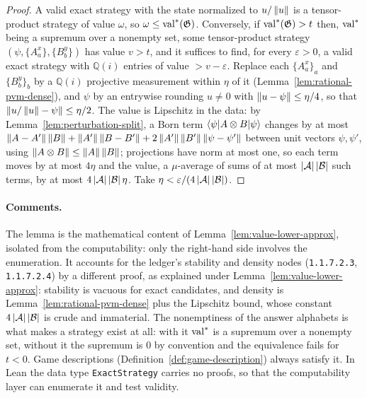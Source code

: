 \begin{proof}
\leanok
A valid exact strategy with the state normalized to $u/\left\| {u} \right\|$ is a tensor-product
strategy of value $\omega$, so $\omega \leq \mathrm{val}^*(\mathfrak{G})$. Conversely, if
$\mathrm{val}^*(\mathfrak{G}) > t$ then, $\mathrm{val}^*$ being a supremum over a nonempty set, some
tensor-product strategy $(\psi, \{A^x_a\}, \{B^y_b\})$ has value $v > t$, and it suffices
to find, for every $\varepsilon > 0$, a valid exact strategy with $\mathbb{Q}(i)$ entries of
value $> v - \varepsilon$. Replace each $\{A^x_a\}_a$ and $\{B^y_b\}_b$ by a $\mathbb{Q}(i)$
projective measurement within $\eta$ of it (Lemma~\ref{lem:rational-pvm-dense}), and
$\psi$ by an entrywise rounding $u \neq 0$ with $\left\| {u - \psi} \right\| \leq \eta/4$, so that
$\left\| {u/\left\| {u} \right\| - \psi} \right\| \leq \eta/2$. The value is Lipschitz in the data: by
Lemma~\ref{lem:perturbation-split}, a Born term $\langle\psi| A \otimes B |\psi\rangle$ changes by
at most $\left\| {A - A'} \right\|\left\| {B} \right\| + \left\| {A'} \right\|\left\| {B - B'} \right\| + 2\left\| {A'} \right\|\left\| {B'} \right\|\left\| {\psi -
\psi'} \right\|$ between unit vectors $\psi, \psi'$, using $\left\| {A \otimes B} \right\| \leq \left\| {A} \right\|\left\| {B} \right\|$;
projections have norm at most one, so each term moves by at most $4\eta$ and the value, a
$\mu$-average of sums of at most $\left\vert {\mathcal{A}} \right\vert\left\vert {\mathcal{B}} \right\vert$ such terms, by at most
$4\left\vert {\mathcal{A}} \right\vert\left\vert {\mathcal{B}} \right\vert\eta$. Take $\eta < \varepsilon / (4\left\vert {\mathcal{A}} \right\vert\left\vert {\mathcal{B}} \right\vert)$.
\end{proof}

\paragraph{Comments.} The lemma is the mathematical content of
Lemma~\ref{lem:value-lower-approx}, isolated from the computability: only the right-hand
side involves the enumeration. It accounts for the ledger's stability and density nodes
(\texttt{1.1.7.2.3}, \texttt{1.1.7.2.4}) by a different proof, as explained under
Lemma~\ref{lem:value-lower-approx}: stability is vacuous for exact candidates, and density
is Lemma~\ref{lem:rational-pvm-dense} plus the Lipschitz bound, whose constant
$4\left\vert {\mathcal{A}} \right\vert\left\vert {\mathcal{B}} \right\vert$ is crude and immaterial. The nonemptiness of the answer
alphabets is what makes a strategy exist at all: with it $\mathrm{val}^*$ is a supremum over a
nonempty set, without it the supremum is $0$ by convention and the equivalence fails for
$t < 0$. Game descriptions (Definition~\ref{def:game-description}) always satisfy it. In
Lean the data type \texttt{ExactStrategy} carries no proofs, so that the computability layer
can enumerate it and test validity.

